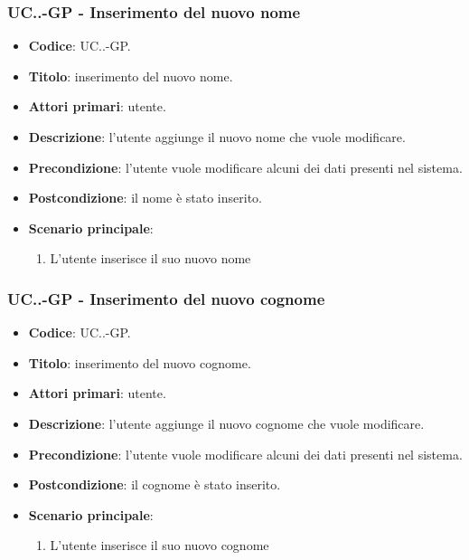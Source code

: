 			\subsubsection{UC\theuccount.\thesubuccount.\thesubsubuccount-GP - Inserimento del nuovo nome}
				\begin{itemize}
					\item \textbf{Codice}: UC\theuccount.\thesubuccount.\thesubsubuccount-GP.
					\item \textbf{Titolo}: inserimento del nuovo nome.
					\item \textbf{Attori primari}: utente.
					\item \textbf{Descrizione}: l'utente aggiunge il nuovo nome che vuole modificare.
					\item \textbf{Precondizione}: l'utente vuole modificare alcuni dei dati presenti nel sistema.
					\item \textbf{Postcondizione}: il nome è stato inserito.
					\item \textbf{Scenario principale}:
					\begin{enumerate}
						\item L'utente inserisce il suo nuovo nome
					\end{enumerate}
				\end{itemize}


			\subsubsection{UC\theuccount.\thesubuccount.\thesubsubuccount-GP - Inserimento del nuovo cognome}
				\begin{itemize}
					\item \textbf{Codice}: UC\theuccount.\thesubuccount.\thesubsubuccount-GP.
					\item \textbf{Titolo}: inserimento del nuovo cognome.
					\item \textbf{Attori primari}: utente.
					\item \textbf{Descrizione}: l'utente aggiunge il nuovo cognome che vuole modificare.
					\item \textbf{Precondizione}: l'utente vuole modificare alcuni dei dati presenti nel sistema.
					\item \textbf{Postcondizione}: il cognome è stato inserito.
					\item \textbf{Scenario principale}:
					\begin{enumerate}
						\item L'utente inserisce il suo nuovo cognome
					\end{enumerate}
				\end{itemize}

